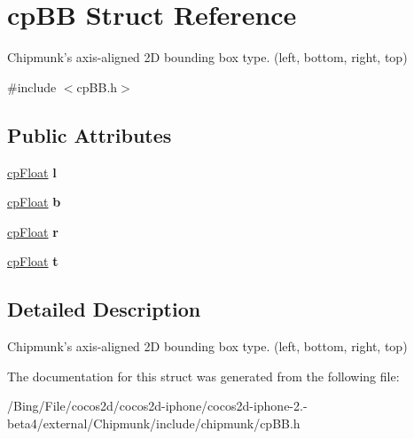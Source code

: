 \hypertarget{structcp_b_b}{\section{cp\-B\-B Struct Reference}
\label{structcp_b_b}
}


Chipmunk's axis-\/aligned 2\-D bounding box type. (left, bottom, right, top)  




{\ttfamily \#include $<$cp\-B\-B.\-h$>$}

\subsection*{Public Attributes}
\begin{DoxyCompactItemize}
\item 
\hypertarget{structcp_b_b_a6f88af28bf75a4ddfd0115fbd24f27ab}{\hyperlink{group__basic_types_gac1ed65573e035bf892505768c852d8d3}{cp\-Float} {\bfseries l}}\label{structcp_b_b_a6f88af28bf75a4ddfd0115fbd24f27ab}

\item 
\hypertarget{structcp_b_b_a8bdd6bf0baf92571d31a1ab85e63a183}{\hyperlink{group__basic_types_gac1ed65573e035bf892505768c852d8d3}{cp\-Float} {\bfseries b}}\label{structcp_b_b_a8bdd6bf0baf92571d31a1ab85e63a183}

\item 
\hypertarget{structcp_b_b_a552ee5c6597e79313bd5c85e7c6557af}{\hyperlink{group__basic_types_gac1ed65573e035bf892505768c852d8d3}{cp\-Float} {\bfseries r}}\label{structcp_b_b_a552ee5c6597e79313bd5c85e7c6557af}

\item 
\hypertarget{structcp_b_b_aee66985512eb137134d15ee6ac343bcd}{\hyperlink{group__basic_types_gac1ed65573e035bf892505768c852d8d3}{cp\-Float} {\bfseries t}}\label{structcp_b_b_aee66985512eb137134d15ee6ac343bcd}

\end{DoxyCompactItemize}


\subsection{Detailed Description}
Chipmunk's axis-\/aligned 2\-D bounding box type. (left, bottom, right, top) 

The documentation for this struct was generated from the following file\-:\begin{DoxyCompactItemize}
\item 
/\-Bing/\-File/cocos2d/cocos2d-\/iphone/cocos2d-\/iphone-\/2.-\/beta4/external/\-Chipmunk/include/chipmunk/cp\-B\-B.\-h\end{DoxyCompactItemize}
